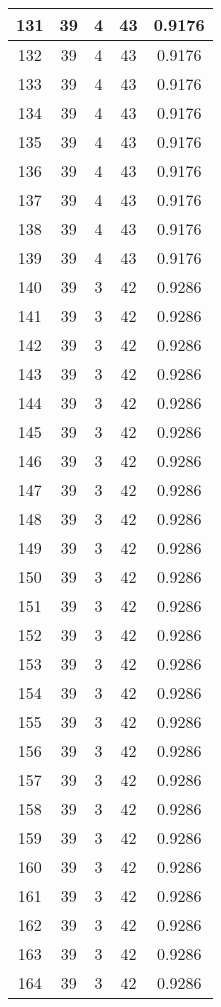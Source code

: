 \documentclass[letterpaper, 12pt]{article}
\begin{document}
\begin{longtable}{|c|c|c|c|c|}
\hline
131 & 39 & 4 & 43 & 0.9176 \\
\hline
132 & 39 & 4 & 43 & 0.9176 \\
\hline
133 & 39 & 4 & 43 & 0.9176 \\
\hline
134 & 39 & 4 & 43 & 0.9176 \\
\hline
135 & 39 & 4 & 43 & 0.9176 \\
\hline
136 & 39 & 4 & 43 & 0.9176 \\
\hline
137 & 39 & 4 & 43 & 0.9176 \\
\hline
138 & 39 & 4 & 43 & 0.9176 \\
\hline
139 & 39 & 4 & 43 & 0.9176 \\
\hline
140 & 39 & 3 & 42 & 0.9286 \\
\hline
141 & 39 & 3 & 42 & 0.9286 \\
\hline
142 & 39 & 3 & 42 & 0.9286 \\
\hline
143 & 39 & 3 & 42 & 0.9286 \\
\hline
144 & 39 & 3 & 42 & 0.9286 \\
\hline
145 & 39 & 3 & 42 & 0.9286 \\
\hline
146 & 39 & 3 & 42 & 0.9286 \\
\hline
147 & 39 & 3 & 42 & 0.9286 \\
\hline
148 & 39 & 3 & 42 & 0.9286 \\
\hline
149 & 39 & 3 & 42 & 0.9286 \\
\hline
150 & 39 & 3 & 42 & 0.9286 \\
\hline
151 & 39 & 3 & 42 & 0.9286 \\
\hline
152 & 39 & 3 & 42 & 0.9286 \\
\hline
153 & 39 & 3 & 42 & 0.9286 \\
\hline
154 & 39 & 3 & 42 & 0.9286 \\
\hline
155 & 39 & 3 & 42 & 0.9286 \\
\hline
156 & 39 & 3 & 42 & 0.9286 \\
\hline
157 & 39 & 3 & 42 & 0.9286 \\
\hline
158 & 39 & 3 & 42 & 0.9286 \\
\hline
159 & 39 & 3 & 42 & 0.9286 \\
\hline
160 & 39 & 3 & 42 & 0.9286 \\
\hline
161 & 39 & 3 & 42 & 0.9286 \\
\hline
162 & 39 & 3 & 42 & 0.9286 \\
\hline
163 & 39 & 3 & 42 & 0.9286 \\
\hline
164 & 39 & 3 & 42 & 0.9286 \\

\end{longtable}
\end{document}
